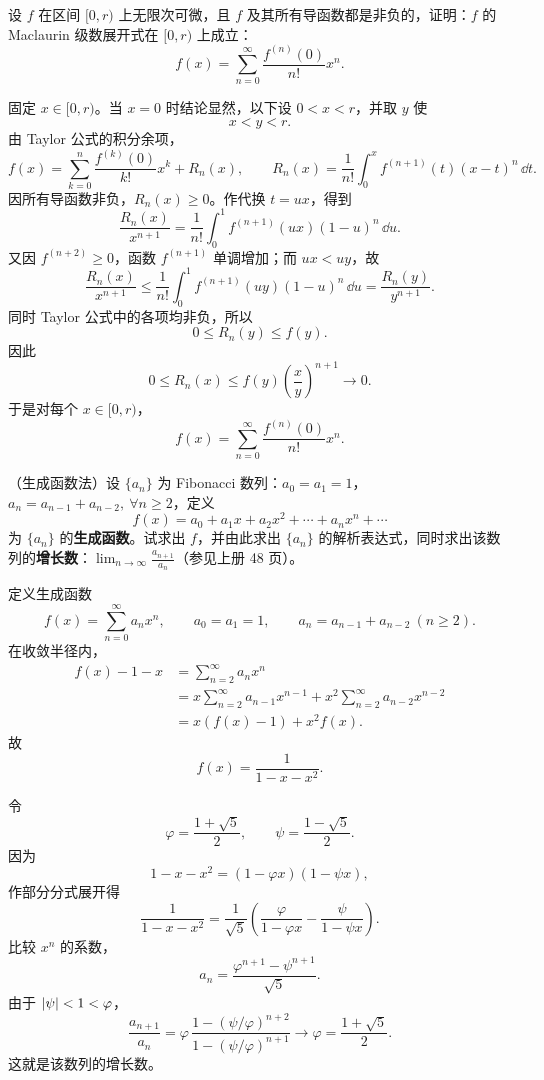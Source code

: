 \begin{xreferenceproblem}[13]
设 $f$ 在区间 $[0,r)$ 上无限次可微，且 $f$ 及其所有导函数都是非负的，证明：$f$ 的 Maclaurin 级数展开式在 $[0,r)$ 上成立：
  \[
    f(x)=\sum_{n=0}^{\infty}\frac{f^{(n)}(0)}{n!}x^n.
  \]
\end{xreferenceproblem}
\begin{xsolution}
固定 $x\in[0,r)$。当 $x=0$ 时结论显然，以下设 $0<x<r$，并取 $y$ 使
\[
  x<y<r.
\]
由 Taylor 公式的积分余项，
\[
  f(x)=\sum_{k=0}^{n}\frac{f^{(k)}(0)}{k!}x^k+R_n(x),
  \qquad
  R_n(x)=\frac1{n!}\int_0^x f^{(n+1)}(t)(x-t)^n\,\dd t.
\]
因所有导函数非负，$R_n(x)\geqslant0$。作代换 $t=ux$，得到
\[
  \frac{R_n(x)}{x^{n+1}}
  =\frac1{n!}\int_0^1 f^{(n+1)}(ux)(1-u)^n\,\dd u.
\]
又因 $f^{(n+2)}\geqslant0$，函数 $f^{(n+1)}$ 单调增加；而 $ux<uy$，故
\[
  \frac{R_n(x)}{x^{n+1}}
  \leqslant
  \frac1{n!}\int_0^1 f^{(n+1)}(uy)(1-u)^n\,\dd u
  =\frac{R_n(y)}{y^{n+1}}.
\]
同时 Taylor 公式中的各项均非负，所以
\[
  0\leqslant R_n(y)\leqslant f(y).
\]
因此
\[
  0\leqslant R_n(x)
  \leqslant f(y)\left(\frac xy\right)^{n+1}\to0.
\]
于是对每个 $x\in[0,r)$，
\[
  \boxed{
  f(x)=\sum_{n=0}^{\infty}\frac{f^{(n)}(0)}{n!}x^n}.
\]
\end{xsolution}


\begin{xreferenceproblem}[14]
（生成函数法）设 $\{a_n\}$ 为 Fibonacci 数列：$a_0=a_1=1$，$a_n=a_{n-1}+a_{n-2},\ \forall n\geqslant2$，定义
  \[
    f(x)=a_0+a_1x+a_2x^2+\cdots+a_nx^n+\cdots
  \]
  为 $\{a_n\}$ 的\textbf{生成函数}。试求出 $f$，并由此求出 $\{a_n\}$ 的解析表达式，同时求出该数列的\textbf{增长数}：$\displaystyle\lim_{n\to\infty}\frac{a_{n+1}}{a_n}$（参见上册 48 页）。
\end{xreferenceproblem}
\begin{xsolution}
定义生成函数
\[
  f(x)=\sum_{n=0}^{\infty}a_nx^n,
  \qquad a_0=a_1=1,
  \qquad a_n=a_{n-1}+a_{n-2}\ (n\geqslant2).
\]
在收敛半径内，
\[
\begin{aligned}
  f(x)-1-x
  &=\sum_{n=2}^{\infty}a_nx^n\\
  &=x\sum_{n=2}^{\infty}a_{n-1}x^{n-1}
   +x^2\sum_{n=2}^{\infty}a_{n-2}x^{n-2}\\
  &=x(f(x)-1)+x^2f(x).
\end{aligned}
\]
故
\[
  \boxed{f(x)=\frac1{1-x-x^2}}.
\]

令
\[
  \varphi=\frac{1+\sqrt5}{2},
  \qquad
  \psi=\frac{1-\sqrt5}{2}.
\]
因为
\[
  1-x-x^2=(1-\varphi x)(1-\psi x),
\]
作部分分式展开得
\[
  \frac1{1-x-x^2}
  =\frac1{\sqrt5}
  \left(\frac{\varphi}{1-\varphi x}
       -\frac{\psi}{1-\psi x}\right).
\]
比较 $x^n$ 的系数，
\[
  \boxed{
  a_n=\frac{\varphi^{n+1}-\psi^{n+1}}{\sqrt5}}.
\]
由于 $\lvert\psi\rvert<1<\varphi$，
\[
  \frac{a_{n+1}}{a_n}
  =\varphi\,
  \frac{1-(\psi/\varphi)^{n+2}}
       {1-(\psi/\varphi)^{n+1}}
  \to\boxed{\varphi=\frac{1+\sqrt5}{2}}.
\]
这就是该数列的增长数。
\end{xsolution}



